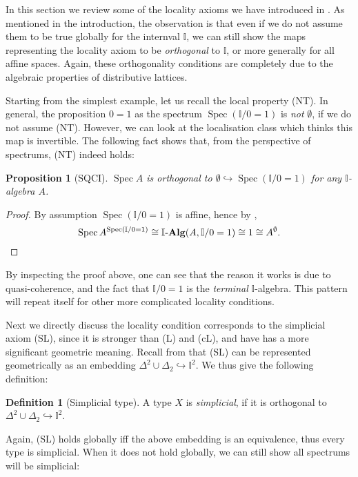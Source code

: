 \documentclass[12pt]{amsart}
\newtheorem{proposition}[theorem]{Proposition}
\theoremstyle{definition}
\newtheorem{definition}[theorem]{Definition}
\newcommand{\mb}[1]{\mathbf{#1}}
\newcommand{\mbb}[1]{\mathbb{#1}}
\newcommand{\I}{\mbb I}
\newcommand{\alg}{\text{-}\mb{Alg}}
\newcommand{\hook}{\hookrightarrow}
\newcommand{\emp}{\emptyset}
\newcommand{\spec}{\operatorname{Spec}}
\begin{document}
In this section we review some of the locality axioms we have introduced in . As mentioned in the introduction, the observation is that even if we do not assume them to be true globally for the internval $\I$, we can still show the maps representing the locality axiom to be \emph{orthogonal} to $\I$, or more generally for all affine spaces. Again, these orthogonality conditions are completely due to the algebraic properties of distributive lattices. 

Starting from the simplest example, let us recall the local property (NT). In general, the proposition $0 = 1$ as the spectrum $\spec(\I/0=1)$ is \emph{not} $\emp$, if we do not assume (NT). However, we can look at the localisation class which thinks this map is invertible. The following fact shows that, from the perspective of spectrums, (NT) indeed holds:

\begin{proposition}[SQCI]\label{specisnontrivial}
  $\spec A$ is orthogonal to $\emp \hook \spec(\I/0=1)$ for any $\I$-algebra $A$.
\end{proposition}
\begin{proof}
  By assumption $\spec(\I/0=1)$ is affine, hence by ,
  \[ \spec A^{\spec(\I/0=1)} \cong \I\alg(A,\I/0=1) \cong 1 \cong A^\emp. \qedhere \]
\end{proof}

By inspecting the proof above, one can see that the reason it works is due to quasi-coherence, and the fact that $\I/0=1$ is the \emph{terminal} $\I$-algebra. This pattern will repeat itself for other more complicated locality conditions.

Next we directly discuss the locality condition corresponds to the simplicial axiom (SL), since it is stronger than (L) and (cL), and have has a more significant geometric meaning. Recall from  that (SL) can be represented geometrically as an embedding $\Delta^2\cup\Delta_2 \hook \I^2$. We thus give the following definition:

\begin{definition}[Simplicial type]
  A type $X$ is \emph{simplicial}, if it is orthogonal to $\Delta^2 \cup \Delta_2 \hook \I^2$.
\end{definition}

Again, (SL) holds globally iff the above embedding is an equivalence, thus every type is simplicial. When it does not hold globally, we can still show all spectrums will be simplicial:
\end{document}
